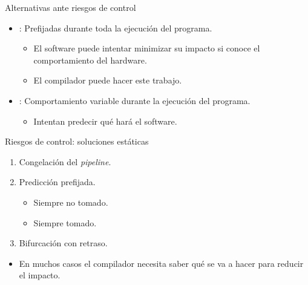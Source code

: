 \begin{frame}[t]{Alternativas ante riesgos de control}
\begin{itemize}
  \item {}: Prefijadas durante toda la ejecución del programa.
    \begin{itemize}
      \item El software puede intentar minimizar su impacto si conoce el comportamiento del hardware.
      \item El compilador puede hacer este trabajo.
    \end{itemize}
  \item {}: Comportamiento variable durante la ejecución del programa.
    \begin{itemize}
      \item Intentan predecir qué hará el software.
    \end{itemize}
\end{itemize}
\end{frame}

\begin{frame}[t]{Riesgos de control: soluciones estáticas}
\begin{enumerate}
  \item Congelación del \emph{pipeline}.
  \item Predicción prefijada.
    \begin{itemize}
      \item Siempre no tomado.
      \item Siempre tomado.
    \end{itemize}
  \item Bifurcación con retraso.
\end{enumerate}
\begin{itemize}
  \item En muchos casos el compilador necesita saber qué se va a hacer para reducir el impacto.
\end{itemize}
\end{frame}

